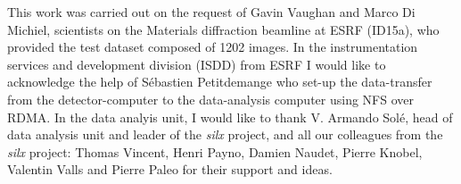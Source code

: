 \documentclass[preprint, pdf]{iucr}              %
\begin{document}
 
This work was carried out on the request of Gavin Vaughan and Marco Di
Michiel, scientists on the Materials diffraction beamline at ESRF (ID15a), who
provided the test dataset composed of 1202 images.
In the instrumentation services and development division (ISDD) from ESRF I
would like to acknowledge the help of Sébastien Petitdemange who set-up the
data-transfer from the detector-computer to the data-analysis computer using NFS
over RDMA. 
In the data analyis unit, I would like to thank V.
Armando Solé, head of data analysis unit and leader of the \textit{silx} project, and all our colleagues from the \textit{silx}
project:
Thomas Vincent, Henri Payno, Damien Naudet, Pierre Knobel, Valentin Valls and
Pierre Paleo for their support and ideas.



\end{document}
